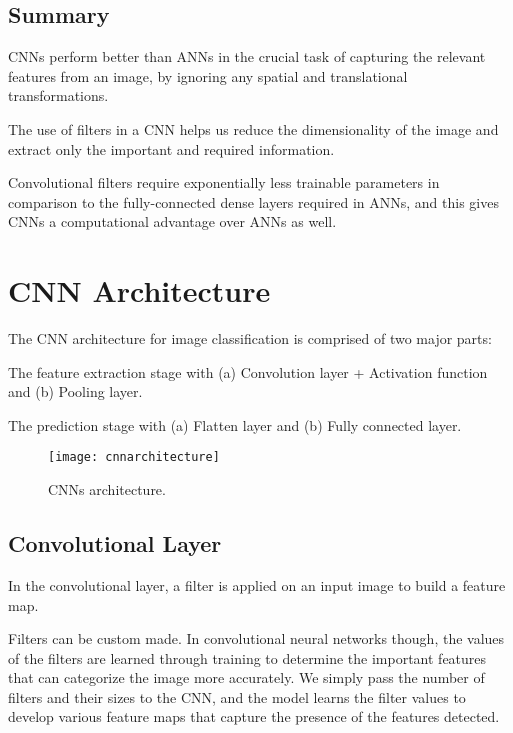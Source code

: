 	\subsection{Summary}

	\begin{bulletedlist}
		\item CNNs perform better than ANNs in the crucial task of capturing the relevant features from an image, by ignoring any spatial and translational transformations.
		\item The use of filters in a CNN helps us reduce the dimensionality of the image and extract only the important and required information.
		\item Convolutional filters require exponentially less trainable parameters in comparison to the fully-connected dense layers required in ANNs, and this gives CNNs a computational advantage over ANNs as well.
	\end{bulletedlist}

	\section{CNN Architecture}

	\begin{bulletedlist}
		\item The CNN architecture for image classification is comprised of two major parts:
		\begin{numberedlist}
			\item The feature extraction stage with (a) Convolution layer + Activation function and (b) Pooling layer.
			\item The prediction stage with (a) Flatten layer and (b) Fully connected layer.
		\end{numberedlist}
	\end{bulletedlist}

	\begin{figure}[tbh]
		\centering
		\texttt{[image: cnnarchitecture]}
		\caption[CNNs architecture]{CNNs architecture.}
		\label{fig:cnnarchitecture}
	\end{figure}

	\subsection{Convolutional Layer}

	\begin{bulletedlist}
		\item In the convolutional layer, a filter is applied on an input image to build a feature map.
		\item Filters can be custom made.  In convolutional neural networks though, the values of the filters are learned through training to determine the important features that can categorize the image more accurately. We simply pass the number of filters and their sizes to the CNN, and the model learns the filter values to develop various feature maps that capture the presence of the features detected.
	\end{bulletedlist}

